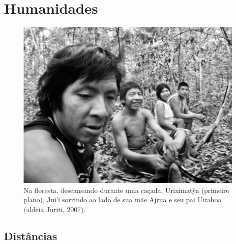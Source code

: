 
\chapter{Humanidades}\label{humanidades}

\begin{figure}[H]
\centering
  \includegraphics[width=\textwidth]{./imgs/100_5648}
\caption{Na floresta, descansando durante uma caçada, Uriximatỹa (primeiro plano), Jui’i
sorrindo ao lado de sua mãe Ajrua e seu pai Uirahoa (aldeia Juriti, 2007).}
\end{figure}

\section{Distâncias}\label{distuxe2ncias}

